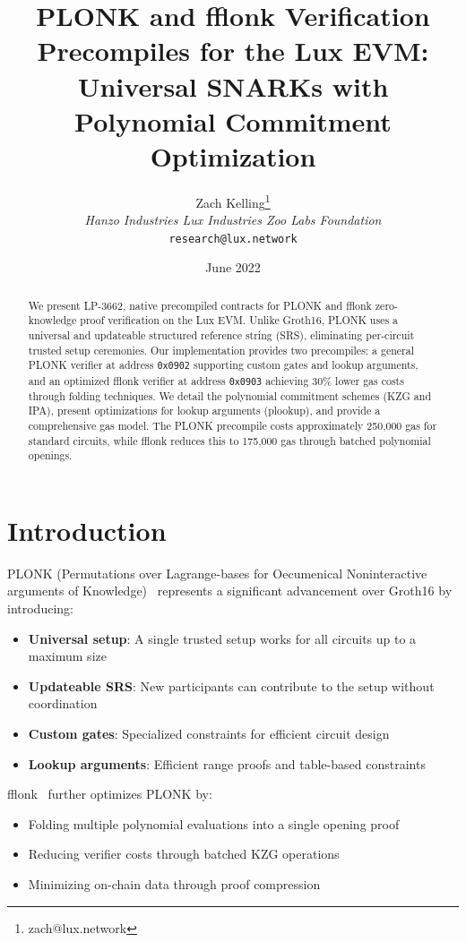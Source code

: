 \documentclass[11pt,a4paper]{article}
\title{PLONK and fflonk Verification Precompiles for the Lux EVM:\\Universal SNARKs with Polynomial Commitment Optimization}
\author{Zach Kelling\thanks{zach@lux.network} \\ \textit{Hanzo Industries \quad Lux Industries \quad Zoo Labs Foundation} \\ \texttt{research@lux.network}}
\date{June 2022}
\theoremstyle{definition}
\begin{document}
\maketitle

\begin{abstract}
We present LP-3662, native precompiled contracts for PLONK and fflonk zero-knowledge proof verification on the Lux EVM. Unlike Groth16, PLONK uses a universal and updateable structured reference string (SRS), eliminating per-circuit trusted setup ceremonies. Our implementation provides two precompiles: a general PLONK verifier at address \texttt{0x0902} supporting custom gates and lookup arguments, and an optimized fflonk verifier at address \texttt{0x0903} achieving 30\% lower gas costs through folding techniques. We detail the polynomial commitment schemes (KZG and IPA), present optimizations for lookup arguments (plookup), and provide a comprehensive gas model. The PLONK precompile costs approximately 250,000 gas for standard circuits, while fflonk reduces this to 175,000 gas through batched polynomial openings.
\end{abstract}

\section{Introduction}

PLONK (Permutations over Lagrange-bases for Oecumenical Noninteractive arguments of Knowledge)~\cite{plonk} represents a significant advancement over Groth16 by introducing:

\begin{itemize}
    \item \textbf{Universal setup}: A single trusted setup works for all circuits up to a maximum size
    \item \textbf{Updateable SRS}: New participants can contribute to the setup without coordination
    \item \textbf{Custom gates}: Specialized constraints for efficient circuit design
    \item \textbf{Lookup arguments}: Efficient range proofs and table-based constraints
\end{itemize}

fflonk~\cite{fflonk} further optimizes PLONK by:
\begin{itemize}
    \item Folding multiple polynomial evaluations into a single opening proof
    \item Reducing verifier costs through batched KZG operations
    \item Minimizing on-chain data through proof compression
\end{itemize}
\end{document}
